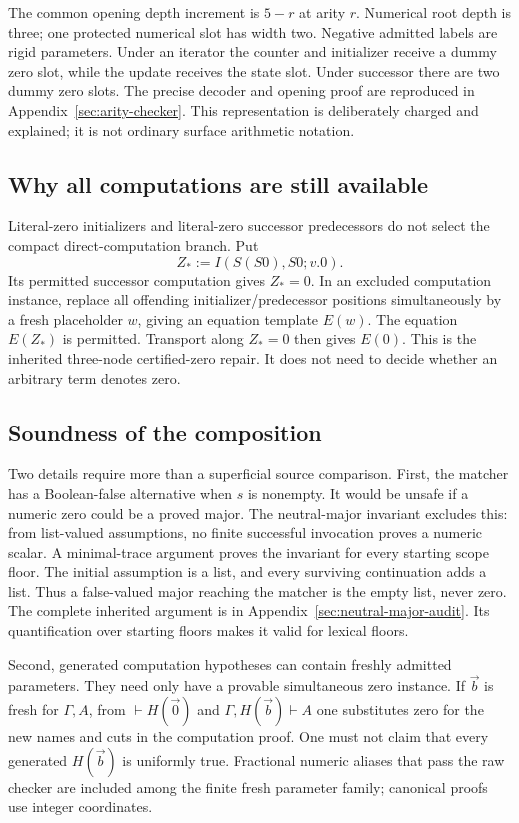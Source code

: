 The common opening depth increment is $5-r$ at arity $r$. Numerical root
depth is three; one protected numerical slot has width two. Negative
admitted labels are rigid parameters. Under an iterator the counter and
initializer receive a dummy zero slot, while the update receives the
state slot. Under successor there are two dummy zero slots. The precise
decoder and opening proof are reproduced in
Appendix~\ref{sec:arity-checker}. This representation is deliberately
charged and explained; it is not ordinary surface arithmetic notation.

\subsection{Why all computations are still available}

Literal-zero initializers and literal-zero successor predecessors do not
select the compact direct-computation branch. Put
\[
                  Z_*:=I(S(S0),S0;v.0).
\]
Its permitted successor computation gives $Z_*=0$. In an excluded
computation instance, replace all offending initializer/predecessor positions
simultaneously by a fresh placeholder $w$, giving an equation template
$E(w)$. The equation $E(Z_*)$ is permitted. Transport along $Z_*=0$
then gives $E(0)$. This is the inherited three-node certified-zero repair.
It does not need to decide whether an arbitrary term denotes zero.

\subsection{Soundness of the composition}

Two details require more than a superficial source comparison. First,
the matcher has a Boolean-false alternative when $s$ is nonempty.
It would be unsafe if a numeric zero could be a proved major. The
neutral-major invariant excludes this: from list-valued assumptions,
no finite successful invocation proves a numeric scalar. A minimal-trace
argument proves the invariant for every starting scope floor. The initial
assumption is a list, and every surviving continuation adds a list. Thus
a false-valued major reaching the matcher is the empty list, never zero.
The complete inherited argument is in Appendix~\ref{sec:neutral-major-audit}.
Its quantification over starting floors makes it valid for lexical floors.

Second, generated computation hypotheses can contain freshly admitted
parameters. They need only have a provable simultaneous zero instance.
If $\vec b$ is fresh for $\Gamma,A$, from
$\vdash H(\vec0)$ and $\Gamma,H(\vec b)\vdash A$ one substitutes zero
for the new names and cuts in the computation proof. One must not claim
that every generated $H(\vec b)$ is uniformly true. Fractional numeric
aliases that pass the raw checker are included among the finite fresh
parameter family; canonical proofs use integer coordinates.


